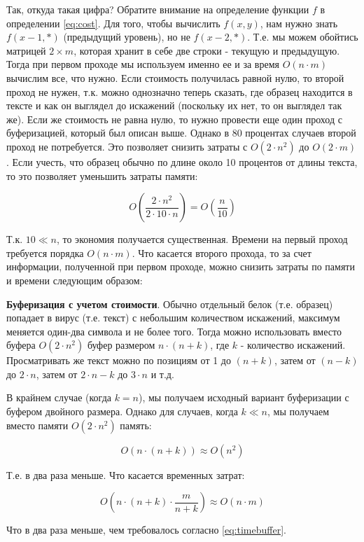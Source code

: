 \documentclass[11pt,a4paper,oneside]{article}
\begin{document}
Так, откуда такая цифра? Обратите внимание на определение функции $f$ в определении \ref{eq:cost}. Для того, чтобы вычислить $f(x,y)$, нам нужно знать $f(x-1,\ast)$ (предыдущий уровень), но не $f(x-2,\ast)$. Т.е. мы можем обойтись матрицей $2\times m$, которая хранит в себе две строки - текущую и предыдущую. Тогда при первом проходе мы используем именно ее и за время $O(n\cdot m)$ вычислим все, что нужно. Если стоимость получилась равной нулю, то второй проход не нужен, т.к. можно однозначно теперь сказать, где образец находится в тексте и как он выглядел до искажений (поскольку их нет, то он выглядел так же). Если же стоимость не равна нулю, то нужно провести еще один проход с буферизацией, который был описан выше. Однако в 80 процентах случаев второй проход не потребуется. Это позволяет снизить затраты с $O(2\cdot n^2)$ до $O(2\cdot m)$. Если учесть, что образец обычно по длине около 10 процентов от длины текста, то это позволяет уменьшить затраты памяти:

\begin{equation}
	O(\frac{2\cdot n^2}{2\cdot 10\cdot n}) = O(\frac{n}{10})
\end{equation}

Т.к. $10\ll n$, то экономия получается существенная. Времени на первый проход требуется порядка $O(n\cdot m)$. Что касается второго прохода, то за счет информации, полученной при первом проходе, можно снизить затраты по памяти и времени следующим образом:

\begin{heuristic}
\textbf{Буферизация с учетом стоимости}. Обычно отдельный белок (т.е. образец) попадает в вирус (т.е. текст) с небольшим количеством искажений, максимум меняется один-два символа и не более того. Тогда можно использовать вместо буфера $O(2\cdot n^2)$ буфер размером $n\cdot (n+k)$, где $k$ - количество искажений. Просматривать же текст можно по позициям от 1 до $(n+k)$, затем от $(n-k)$ до $2\cdot n$, затем от $2\cdot n -k$ до $3\cdot n$ и т.д.
\end{heuristic}

В крайнем случае (когда $k=n$), мы получаем исходный вариант буферизации с буфером двойного размера. Однако для случаев, когда $k\ll n$, мы получаем вместо памяти $O(2\cdot n^2)$ память:

\begin{equation}
	O(n\cdot(n+k))\approx O(n^2)
\end{equation}

Т.е. в два раза меньше. Что касается временных затрат:

\begin{equation}
	O(n\cdot (n+k)\cdot\frac{m}{n+k})\approx O(n\cdot m)
\end{equation}

Что в два раза меньше, чем требовалось согласно \ref{eq:timebuffer}.
\end{document}
